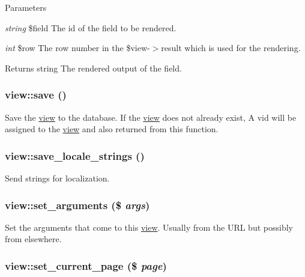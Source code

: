 \begin{DoxyParams}{Parameters}
\item[{\em string}]\$field The id of the field to be rendered.\item[{\em int}]\$row The row number in the \$view-\/$>$result which is used for the rendering.\end{DoxyParams}
\begin{DoxyReturn}{Returns}
string The rendered output of the field. 
\end{DoxyReturn}
\hypertarget{classview_a001430d43fd397235f63ad29fd269d53}{
\subsubsection[{save}]{\setlength{\rightskip}{0pt plus 5cm}view::save ()}}
\label{classview_a001430d43fd397235f63ad29fd269d53}
Save the \hyperlink{classview}{view} to the database. If the \hyperlink{classview}{view} does not already exist, A vid will be assigned to the \hyperlink{classview}{view} and also returned from this function. \hypertarget{classview_a72b8eadd6ae4a5c5d523dd87c258b470}{
\subsubsection[{save\_\-locale\_\-strings}]{\setlength{\rightskip}{0pt plus 5cm}view::save\_\-locale\_\-strings ()}}
\label{classview_a72b8eadd6ae4a5c5d523dd87c258b470}
Send strings for localization. \hypertarget{classview_a3cc8de2cedfc558314c27ee8ca995235}{
\subsubsection[{set\_\-arguments}]{\setlength{\rightskip}{0pt plus 5cm}view::set\_\-arguments (\$ {\em args})}}
\label{classview_a3cc8de2cedfc558314c27ee8ca995235}
Set the arguments that come to this \hyperlink{classview}{view}. Usually from the URL but possibly from elsewhere. \hypertarget{classview_a421f000fc97fb8f7dda965cbdd285071}{
\subsubsection[{set\_\-current\_\-page}]{\setlength{\rightskip}{0pt plus 5cm}view::set\_\-current\_\-page (\$ {\em page})}}
